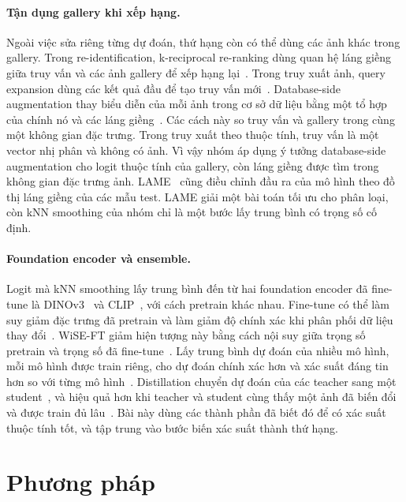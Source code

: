 \documentclass[10pt,twocolumn,letterpaper]{article}
\begin{document}
\paragraph{Tận dụng gallery khi xếp hạng.} Ngoài việc sửa riêng từng dự đoán, thứ hạng còn có thể dùng các ảnh khác trong gallery. Trong re-identification, k-reciprocal re-ranking dùng quan hệ láng giềng giữa truy vấn và các ảnh gallery để xếp hạng lại~\cite{kreciprocal}. Trong truy xuất ảnh, query expansion dùng các kết quả đầu để tạo truy vấn mới~\cite{chum07}. Database-side augmentation thay biểu diễn của mỗi ảnh trong cơ sở dữ liệu bằng một tổ hợp của chính nó và các láng giềng~\cite{turcot,arandjelovic,gordo}. Các cách này so truy vấn và gallery trong cùng một không gian đặc trưng. Trong truy xuất theo thuộc tính, truy vấn là một vector nhị phân và không có ảnh. Vì vậy nhóm áp dụng ý tưởng database-side augmentation cho logit thuộc tính của gallery, còn láng giềng được tìm trong không gian đặc trưng ảnh. LAME~\cite{lame} cũng điều chỉnh đầu ra của mô hình theo đồ thị láng giềng của các mẫu test. LAME giải một bài toán tối ưu cho phân loại, còn kNN smoothing của nhóm chỉ là một bước lấy trung bình có trọng số cố định.

\paragraph{Foundation encoder và ensemble.} Logit mà kNN smoothing lấy trung bình đến từ hai foundation encoder đã fine-tune là DINOv3~\cite{dinov3} và CLIP~\cite{clip}, với cách pretrain khác nhau. Fine-tune có thể làm suy giảm đặc trưng đã pretrain và làm giảm độ chính xác khi phân phối dữ liệu thay đổi~\cite{lpft}. WiSE-FT giảm hiện tượng này bằng cách nội suy giữa trọng số pretrain và trọng số đã fine-tune~\cite{wiseft}. Lấy trung bình dự đoán của nhiều mô hình, mỗi mô hình được train riêng, cho dự đoán chính xác hơn và xác suất đáng tin hơn so với từng mô hình~\cite{deepens}. Distillation chuyển dự đoán của các teacher sang một student~\cite{hinton}, và hiệu quả hơn khi teacher và student cùng thấy một ảnh đã biến đổi và được train đủ lâu~\cite{patient}. Bài này dùng các thành phần đã biết đó để có xác suất thuộc tính tốt, và tập trung vào bước biến xác suất thành thứ hạng.

\section{Phương pháp}
\label{sec:method}
\end{document}
